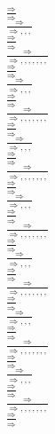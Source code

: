 \documentclass[11pt]{article}
\begin{document}
\begin{center}
\bigskip
\\$\frac{\Rightarrow }{\Rightarrow }$
\bigskip
\\$\frac{\Rightarrow }{\Rightarrow , , , }$
\bigskip
\\$\frac{\Rightarrow }{\Rightarrow }$
\bigskip
\\$\frac{\Rightarrow }{\Rightarrow , , , , , , , }$
\bigskip
\\$\frac{\Rightarrow }{\Rightarrow }$
\bigskip
\\$\frac{\Rightarrow }{\Rightarrow , , , }$
\bigskip
\\$\frac{\Rightarrow }{\Rightarrow }$
\bigskip
\\$\frac{\Rightarrow }{\Rightarrow , , , , , , , }$
\bigskip
\\$\frac{\Rightarrow }{\Rightarrow }$
\bigskip
\\$\frac{\Rightarrow }{\Rightarrow , , , }$
\bigskip
\\$\frac{\Rightarrow }{\Rightarrow }$
\bigskip
\\$\frac{\Rightarrow }{\Rightarrow , , , , , , , }$
\bigskip
\\$\frac{\Rightarrow }{\Rightarrow }$
\bigskip
\\$\frac{\Rightarrow }{\Rightarrow , , , }$
\bigskip
\\$\frac{\Rightarrow }{\Rightarrow }$
\bigskip
\\$\frac{\Rightarrow }{\Rightarrow , , , , , , , }$
\bigskip
\\$\frac{\Rightarrow }{\Rightarrow }$
\bigskip
\\$\frac{\Rightarrow }{\Rightarrow , , , }$
\bigskip
\\$\frac{\Rightarrow }{\Rightarrow }$
\bigskip
\\$\frac{\Rightarrow }{\Rightarrow , , , , , , , }$
\bigskip
\\$\frac{\Rightarrow }{\Rightarrow }$
\bigskip
\\$\frac{\Rightarrow }{\Rightarrow , , , }$
\bigskip
\\$\frac{\Rightarrow }{\Rightarrow }$
\bigskip
\\$\frac{\Rightarrow }{\Rightarrow , , , , , , , }$
\bigskip
\\$\frac{\Rightarrow }{\Rightarrow }$
\bigskip
\\$\frac{\Rightarrow }{\Rightarrow , , , }$
\bigskip
\\$\frac{\Rightarrow }{\Rightarrow }$
\bigskip
\\$\frac{\Rightarrow }{\Rightarrow , , , , , , , }$
\bigskip
\\$\frac{\Rightarrow }{\Rightarrow }$

\end{center}
\end{document}
